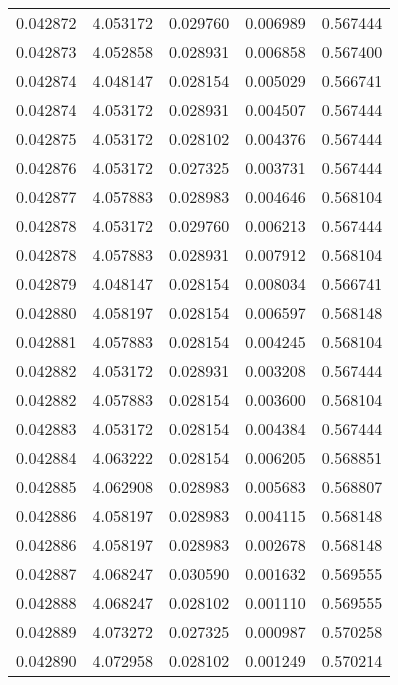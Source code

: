 \begin{tabular}{lrrrr}
0.042872    &  4.053172 &  0.029760 &  0.006989 &             0.567444 \\
0.042873    &  4.052858 &  0.028931 &  0.006858 &             0.567400 \\
0.042874    &  4.048147 &  0.028154 &  0.005029 &             0.566741 \\
0.042874    &  4.053172 &  0.028931 &  0.004507 &             0.567444 \\
0.042875    &  4.053172 &  0.028102 &  0.004376 &             0.567444 \\
0.042876    &  4.053172 &  0.027325 &  0.003731 &             0.567444 \\
0.042877    &  4.057883 &  0.028983 &  0.004646 &             0.568104 \\
0.042878    &  4.053172 &  0.029760 &  0.006213 &             0.567444 \\
0.042878    &  4.057883 &  0.028931 &  0.007912 &             0.568104 \\
0.042879    &  4.048147 &  0.028154 &  0.008034 &             0.566741 \\
0.042880    &  4.058197 &  0.028154 &  0.006597 &             0.568148 \\
0.042881    &  4.057883 &  0.028154 &  0.004245 &             0.568104 \\
0.042882    &  4.053172 &  0.028931 &  0.003208 &             0.567444 \\
0.042882    &  4.057883 &  0.028154 &  0.003600 &             0.568104 \\
0.042883    &  4.053172 &  0.028154 &  0.004384 &             0.567444 \\
0.042884    &  4.063222 &  0.028154 &  0.006205 &             0.568851 \\
0.042885    &  4.062908 &  0.028983 &  0.005683 &             0.568807 \\
0.042886    &  4.058197 &  0.028983 &  0.004115 &             0.568148 \\
0.042886    &  4.058197 &  0.028983 &  0.002678 &             0.568148 \\
0.042887    &  4.068247 &  0.030590 &  0.001632 &             0.569555 \\
0.042888    &  4.068247 &  0.028102 &  0.001110 &             0.569555 \\
0.042889    &  4.073272 &  0.027325 &  0.000987 &             0.570258 \\
0.042890    &  4.072958 &  0.028102 &  0.001249 &             0.570214 \\

\end{tabular}
